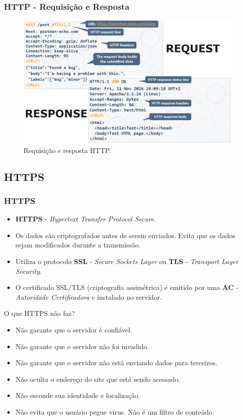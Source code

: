 \documentclass[
	10pt, %
	t, %
]{beamer}
\begin{document}
\begin{frame}
	\frametitle{HTTP - Requisição e Resposta}

	\begin{figure}
		\centering
		\includegraphics[width=0.9\linewidth]{req_res.png}
		\caption{Requisição e resposta HTTP.}
		\label{fig:http_req_res}
	\end{figure}

\end{frame}

\subsection{HTTPS}

\begin{frame}
	\frametitle{HTTPS}

	\begin{itemize}
		\item \textbf{HTTPS} - \textit{Hypertext Transfer Protocol \alert{Secure}}.
		\item Os dados são criptografados antes de serem enviados. Evita que os dados sejam modificados durante a transmissão.
		\item Utiliza o protocolo \textbf{SSL} - \textit{Secure Sockets Layer} ou \textbf{TLS} - \textit{Transport Layer Security}.
		\item O certificado SSL/TLS (criptografia assimétrica) é emitido por uma \textbf{AC} - \textit{Autoridade Certificadora} e instalado no servidor.
	\end{itemize}
	
	\begin{block}{O que HTTPS não faz?}
		\begin{itemize}
			\item Não garante que o servidor é confiável.
			\item Não garante que o servidor não foi invadido.
			\item Não garante que o servidor não está enviando dados para terceiros.
			\item Não oculta o endereço do site que está sendo acessado.
			\item Não esconde sua identidade e localização.
			\item Não evita que o usuário pegue vírus. Não é um filtro de conteúdo.
		\end{itemize}
		
	\end{block}
	
\end{frame}
\end{document}
